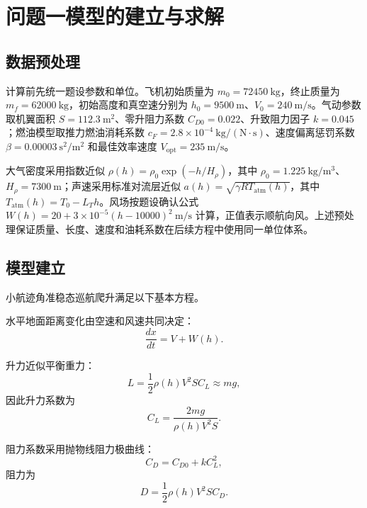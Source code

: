 \documentclass[withoutpreface,bwprint]{cumcmthesis}
\begin{document}
\section{问题一模型的建立与求解}

\subsection{数据预处理}

计算前先统一题设参数和单位。飞机初始质量为 $m_0=72450\ \mathrm{kg}$，终止质量为 $m_f=62000\ \mathrm{kg}$，初始高度和真空速分别为 $h_0=9500\ \mathrm{m}$、$V_0=240\ \mathrm{m/s}$。气动参数取机翼面积 $S=112.3\ \mathrm{m^2}$、零升阻力系数 $C_{D0}=0.022$、升致阻力因子 $k=0.045$；燃油模型取推力燃油消耗系数 $c_F=2.8\times 10^{-4}\ \mathrm{kg/(N\cdot s)}$、速度偏离惩罚系数 $\beta=0.00003\ \mathrm{s^2/m^2}$ 和最佳效率速度 $V_{\mathrm{opt}}=235\ \mathrm{m/s}$。

大气密度采用指数近似 $\rho(h)=\rho_0\exp(-h/H_\rho)$，其中 $\rho_0=1.225\ \mathrm{kg/m^3}$、$H_\rho=7300\ \mathrm{m}$；声速采用标准对流层近似 $a(h)=\sqrt{\gamma R T_{\mathrm{atm}}(h)}$，其中 $T_{\mathrm{atm}}(h)=T_0-L_T h$。风场按题设确认公式 $W(h)=20+3\times 10^{-5}(h-10000)^2\ \mathrm{m/s}$ 计算，正值表示顺航向风。上述预处理保证质量、长度、速度和油耗系数在后续方程中使用同一单位体系。

\subsection{模型建立}

小航迹角准稳态巡航爬升满足以下基本方程\cite{kuang2012,xu2023}。

水平地面距离变化由空速和风速共同决定：
\begin{equation}
\frac{dx}{dt}=V+W(h).
\label{eq:dxdt}
\end{equation}

升力近似平衡重力：
\begin{equation}
L=\frac{1}{2}\rho(h)V^2SC_L\approx mg,
\label{eq:lift}
\end{equation}
因此升力系数为
\begin{equation}
C_L=\frac{2mg}{\rho(h)V^2S}.
\label{eq:CL}
\end{equation}

阻力系数采用抛物线阻力极曲线\cite{xu2023}：
\begin{equation}
C_D=C_{D0}+kC_L^2,
\label{eq:CD}
\end{equation}
阻力为
\begin{equation}
D=\frac{1}{2}\rho(h)V^2SC_D.
\label{eq:drag}
\end{equation}
\end{document}
